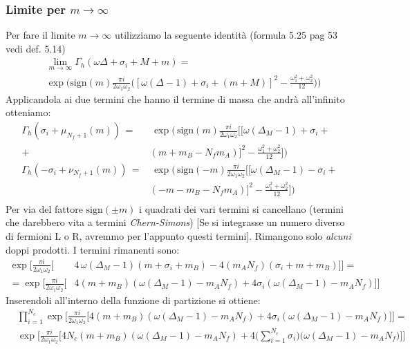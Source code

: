 \documentclass[a4paper,12pt]{article}
\newcommand{\sign}{\mbox{sign}}
\begin{document}
\subsubsection{Limite per $m \rightarrow \infty$}
Per fare il limite $m \rightarrow \infty$ utilizziamo la seguente identità \citep{Aharony:2013dha} (formula 5.25 pag 53 vedi def. 5.14)
\begin{align*}
 &\lim_{ m \rightarrow \infty } \Gamma_h ( \omega \Delta + \sigma_i + M + m) = \\
& \exp \bigg( \mbox{sign} (m) \frac{\pi i }{2 \omega_1 \omega_2} \bigg( [ \omega (\Delta
 -1) + \sigma_i + (m+M)]^2 - \frac{\omega_1^2 + \omega_2^2}{12} \bigg) \bigg)
\end{align*}
Applicandola ai due termini che hanno il termine di massa che andrà all'infinito otteniamo:
\begin{align*}
\Gamma_h ( \sigma_i + \mu_{N_f+1}(m)) \, = &\, \exp \bigg( \, \mbox{sign}(m) \frac{\pi i}{2 \omega_1 \omega_2 } \big[ [ \omega (\Delta_M - 1) + \sigma_i + \\
+ & ( m + m_B - N_f m_A)]^2 - \frac{ \omega_1^2 + \omega_2^2 }{12} \big] \bigg )\\
\Gamma_h ( - \sigma_i + \nu_{N_f+1}(m)) \, = &\, \exp \bigg( \, \mbox{sign}(-m) \frac{\pi i}{2 \omega_1 \omega_2 } \big[ [ \omega (\Delta_M - 1) - \sigma_i + \\
&( - m - m_B - N_f m_A)]^2 - \frac{ \omega_1^2 + \omega_2^2 }{12} \big] \bigg )\\
\end{align*}
Per via del fattore $\sign(\pm m)$ i quadrati dei vari termini si cancellano (termini che darebbero vita a termini \emph{Chern-Simons})
[Se si integrasse un numero diverso di fermioni L o R, avremmo per l'appunto questi termini]. Rimangono solo \emph{alcuni} doppi prodotti. I termini rimanenti sono:
\begin{align*}
\exp \bigg[ \frac{\pi i}{2 \omega_1 \omega_2 } \bigg[& 4 \,  \omega (\Delta_M - 1) ( m + \sigma_i + m_B )  - 4 ( m_A N_f) ( \sigma_i + m + m_B) \bigg] \bigg]  = \\
 = \exp \bigg[ \frac{\pi i}{2 \omega_1 \omega_2 } \bigg[& 4  ( m  + m_B ) ( \omega (\Delta_M - 1) -  m_A N_f ) + 	4 \sigma_i  (\omega (\Delta_M - 1) -  m_A N_f)  \bigg] \bigg]
\end{align*}
Inserendoli all'interno della funzione di partizione si ottiene:
\begin{align*}
 &\prod_{i=1}^{N_c} \exp \bigg[ \frac{\pi i}{2 \omega_1 \omega_2 } \bigg[ 4  ( m  + m_B ) ( \omega (\Delta_M - 1) -  m_A N_f ) + 	4 \sigma_i  (\omega (\Delta_M - 1) -  m_A N_f)\bigg] \bigg] = \\
 &\exp \bigg[ \frac{\pi i}{2 \omega_1 \omega_2 } \bigg[ 4 N_c  ( m  + m_B ) ( \omega (\Delta_M - 1) -  m_A N_f ) +4\big( \sum_{i=1}^{N_c}	 \sigma_i  \big) \big(\omega (\Delta_M - 1) -  m_A N_f \big)  \bigg] \bigg] \\
\end{align*}
\end{document}

